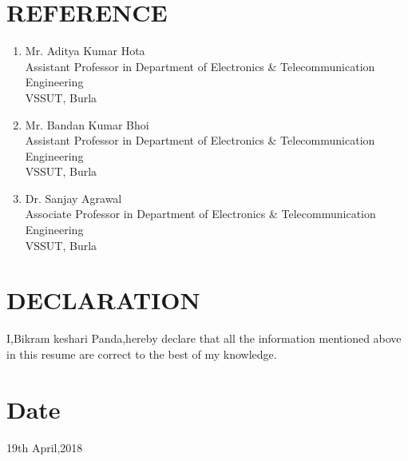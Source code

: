 \documentclass{article}
\begin{document}
\section{REFERENCE}
\begin{enumerate}
 \item Mr. Aditya Kumar Hota\\
Assistant Professor in Department of Electronics \& Telecommunication Engineering\\
VSSUT, Burla
\item Mr. Bandan Kumar Bhoi\\
Assistant Professor in Department of Electronics \& Telecommunication Engineering\\
VSSUT, Burla
\item Dr. Sanjay Agrawal\\
Associate Professor in Department of Electronics \& Telecommunication Engineering\\
VSSUT, Burla
\end{enumerate}
\section{DECLARATION}
    I,Bikram keshari Panda,hereby declare that all the information mentioned above in this resume are correct to the best of my knowledge. 
\section{Date}
19th April,2018
\end{document}

